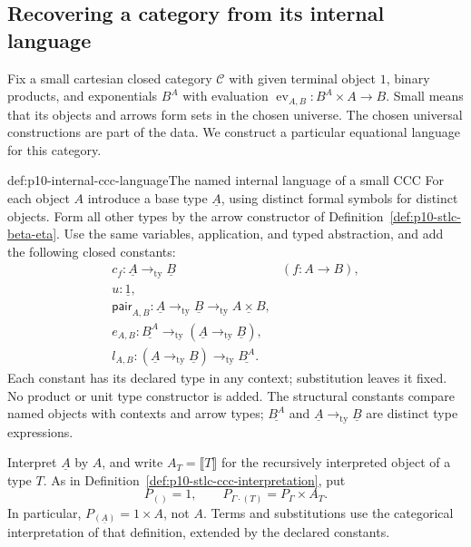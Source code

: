 
\subsection{Recovering a category from its internal language}
\label{sec:p10-internal-cartesian-language}

Fix a small cartesian closed category \(\mathcal C\) with given terminal
object \(1\), binary products, and exponentials \(B^A\) with evaluation
\(\operatorname{ev}_{A,B}:B^A\times A\to B\).
Small means that its objects and arrows form sets in the chosen universe.
The chosen universal constructions are part of the data.
We construct a particular equational language for this category.

\begin{hbdefinition}{def:p10-internal-ccc-language}{The named internal language of a small CCC}
For each object \(A\) introduce a base type \(\underline A\), using
distinct formal symbols for distinct objects.  Form all other types by
the arrow constructor of Definition~\ref{def:p10-stlc-beta-eta}.
Use the same variables, application, and typed abstraction, and add
the following closed constants:
\[
\begin{array}{ll}
 c_f:\underline A\mathbin{\to_{\mathrm{ty}}}\underline B
       &(f:A\to B),\\
 u:\underline1,&\\
 \mathsf{pair}_{A,B}:\underline A\mathbin{\to_{\mathrm{ty}}}
        \underline B\mathbin{\to_{\mathrm{ty}}}\underline{A\times B},&\\
 e_{A,B}:\underline{B^A}\mathbin{\to_{\mathrm{ty}}}
        (\underline A\mathbin{\to_{\mathrm{ty}}}\underline B),&\\
 l_{A,B}:(\underline A\mathbin{\to_{\mathrm{ty}}}\underline B)
        \mathbin{\to_{\mathrm{ty}}}\underline{B^A}.&
\end{array}
\]
Each constant has its declared type in any context; substitution leaves
it fixed.  No product or unit type constructor is added.
The structural constants compare named objects with contexts and arrow
types; \(\underline{B^A}\) and
\(\underline A\mathbin{\to_{\mathrm{ty}}}\underline B\) are distinct
type expressions.

Interpret \(\underline A\) by \(A\), and write \(A_T=\llbracket T\rrbracket\)
for the recursively interpreted object of a type \(T\).
As in Definition~\ref{def:p10-stlc-ccc-interpretation}, put
\[
 P_{()}=1,\qquad P_{\Gamma\cdot(T)}=P_\Gamma\times A_T.
\]
In particular, \(P_{(\underline A)}=1\times A\), not \(A\).
Terms and substitutions use the categorical interpretation of that
definition, extended by the declared constants.


\end{hbdefinition}
